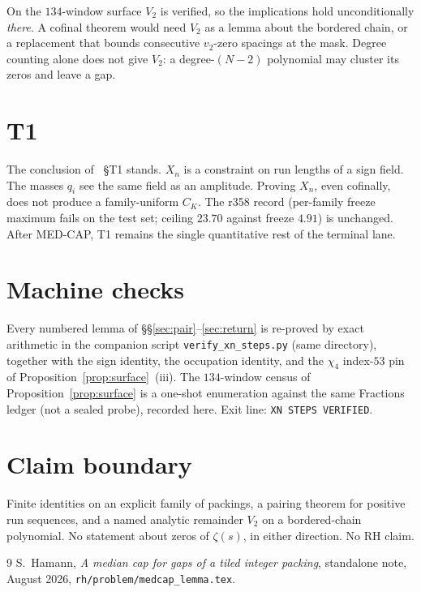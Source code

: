 \documentclass[11pt]{article}
\theoremstyle{remark}
\begin{document}
On the $134$-window surface $V_2$ is verified, so the implications
hold unconditionally \emph{there}.  A cofinal theorem would need
$V_2$ as a lemma about the bordered chain, or a replacement that
bounds consecutive $v_2$-zero spacings at the mask.  Degree counting
alone does not give $V_2$: a degree-$(N-2)$ polynomial may cluster
its zeros and leave a gap.

\section{T1}\label{sec:t1}

The conclusion of \cite{medcap}~\S T1 stands.  $X_n$ is a constraint
on run lengths of a sign field.  The masses $q_i$ see the same field
as an amplitude.  Proving $X_n$, even cofinally, does not produce a
family-uniform $C_K$.  The r358 record (per-family freeze maximum
fails on the test set; ceiling $23.70$ against freeze $4.91$) is
unchanged.  After MED-CAP, T1 remains the single quantitative rest
of the terminal lane.

\section{Machine checks}\label{sec:machine}

Every numbered lemma of \S\S\ref{sec:pair}--\ref{sec:return} is
re-proved by exact arithmetic in the companion script
\texttt{verify\_xn\_steps.py} (same directory), together with the
sign identity, the occupation identity, and the $\chi_4$
index-$53$ pin of Proposition~\ref{prop:surface}~(iii).  The
$134$-window census of Proposition~\ref{prop:surface} is a one-shot
enumeration against the same Fractions ledger (not a sealed
probe), recorded here.  Exit line: \texttt{XN STEPS VERIFIED}.

\section*{Claim boundary}

Finite identities on an explicit family of packings, a pairing
theorem for positive run sequences, and a named analytic remainder
$V_2$ on a bordered-chain polynomial.  No statement about zeros of
$\zeta(s)$, in either direction.  No RH claim.

\begin{thebibliography}{9}
S.~Hamann,
\textit{A median cap for gaps of a tiled integer packing},
standalone note, August 2026,
\texttt{rh/problem/medcap\_lemma.tex}.
\end{thebibliography}
\end{document}
